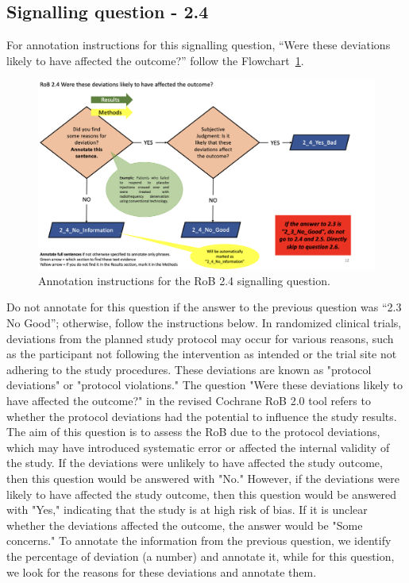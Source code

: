 \documentclass[sn-mathphys,Numbered]{sn-jnl}%
\begin{document}
\subsection*{Signalling question - 2.4 }
%
For annotation instructions for this signalling question, ``Were these deviations likely to have affected the outcome?'' follow the Flowchart~\ref{fig:2_4}.
%
\begin{figure}[hbt]
    \centering
    \includegraphics[width=\textwidth]{figures/2_4.png}
    \caption{Annotation instructions for the RoB 2.4 signalling question.}
    \label{fig:2_4}
\end{figure}
%
Do not annotate for this question if the answer to the previous question was ``2.3 No Good''; otherwise, follow the instructions below.
In randomized clinical trials, deviations from the planned study protocol may occur for various reasons, such as the participant not following the intervention as intended or the trial site not adhering to the study procedures.
These deviations are known as "protocol deviations" or "protocol violations."
The question "Were these deviations likely to have affected the outcome?" in the revised Cochrane RoB 2.0 tool refers to whether the protocol deviations had the potential to influence the study results.
The aim of this question is to assess the RoB due to the protocol deviations, which may have introduced systematic error or affected the internal validity of the study.
If the deviations were unlikely to have affected the study outcome, then this question would be answered with "No."
However, if the deviations were likely to have affected the study outcome, then this question would be answered with "Yes," indicating that the study is at high risk of bias.
If it is unclear whether the deviations affected the outcome, the answer would be "Some concerns."
To annotate the information from the previous question, we identify the percentage of deviation (a number) and annotate it, while for this question, we look for the reasons for these deviations and annotate them.
\end{document}
